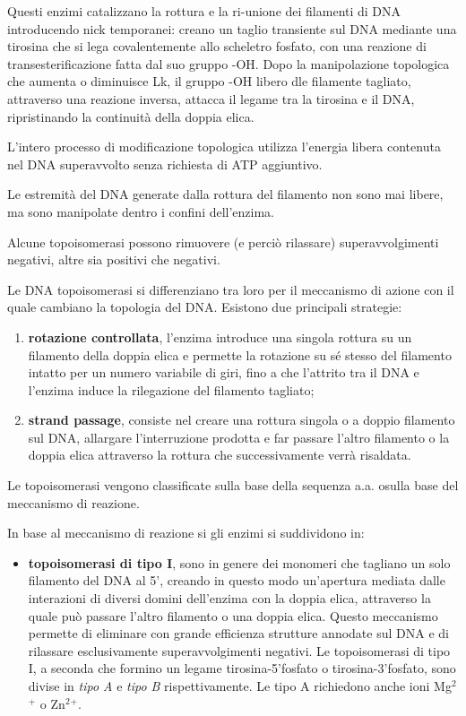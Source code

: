 \documentclass[11pt]{book}
\begin{document}
Questi enzimi catalizzano la rottura e la ri-unione dei filamenti di DNA
introducendo nick temporanei: creano un taglio transiente sul DNA
mediante una tirosina che si lega covalentemente allo scheletro fosfato,
con una reazione di transesterificazione fatta dal suo gruppo -OH. Dopo
la manipolazione topologica che aumenta o diminuisce Lk, il gruppo -OH
libero dle filamente tagliato, attraverso una reazione inversa, attacca
il legame tra la tirosina e il DNA, ripristinando la continuità della
doppia elica.

L'intero processo di modificazione topologica utilizza l'energia libera
contenuta nel DNA superavvolto senza richiesta di ATP aggiuntivo.

Le estremità del DNA generate dalla rottura del filamento non sono mai
libere, ma sono manipolate dentro i confini dell'enzima.

Alcune topoisomerasi possono rimuovere (e perciò rilassare)
superavvolgimenti negativi, altre sia positivi che negativi.

Le DNA topoisomerasi si differenziano tra loro per il meccanismo di
azione con il quale cambiano la topologia del DNA. Esistono due
principali strategie:

\begin{enumerate}
\def\labelenumi{\arabic{enumi}.}
\itemsep1pt\parskip0pt
\item
  \textbf{rotazione controllata}, l'enzima introduce una singola rottura
  su un filamento della doppia elica e permette la rotazione su sé
  stesso del filamento intatto per un numero variabile di giri, fino a
  che l'attrito tra il DNA e l'enzima induce la rilegazione del
  filamento tagliato;
\item
  \textbf{strand passage}, consiste nel creare una rottura singola o a
  doppio filamento sul DNA, allargare l'interruzione prodotta e far
  passare l'altro filamento o la doppia elica attraverso la rottura che
  successivamente verrà risaldata.
\end{enumerate}

Le topoisomerasi vengono classificate sulla base della sequenza a.a.
osulla base del meccanismo di reazione.

In base al meccanismo di reazione si gli enzimi si suddividono in:

\begin{itemize}
\itemsep1pt\parskip0pt
\item
  \textbf{topoisomerasi di tipo I}, sono in genere dei monomeri che
  tagliano un solo filamento del DNA al 5', creando in questo modo
  un'apertura mediata dalle interazioni di diversi domini dell'enzima
  con la doppia elica, attraverso la quale può passare l'altro filamento
  o una doppia elica. Questo meccanismo permette di eliminare con grande
  efficienza strutture annodate sul DNA e di rilassare esclusivamente
  superavvolgimenti negativi. Le topoisomerasi di tipo I, a seconda che
  formino un legame tirosina-5'fosfato o tirosina-3'fosfato, sono divise
  in \emph{tipo A} e \emph{tipo B} rispettivamente. Le tipo A richiedono
  anche ioni Mg\(^2\)\(^+\) o Zn\(^2\)\(^+\).
\end{itemize}
\end{document}
